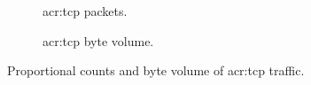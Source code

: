 \begin{figure}
	\centering
	\begin{subfigure}{\linewidth}
		\centering
		\caption{\gls{acr:tcp} packets.}
	\end{subfigure}
	\begin{subfigure}{\linewidth}
		\centering
		\caption{\gls{acr:tcp} byte volume.}
	\end{subfigure}
	\caption[Proportional counts and byte volume of TCP traffic.]{Proportional counts and byte volume of \gls{acr:tcp} traffic.\label{fig:caida-tcp}}
\end{figure}

